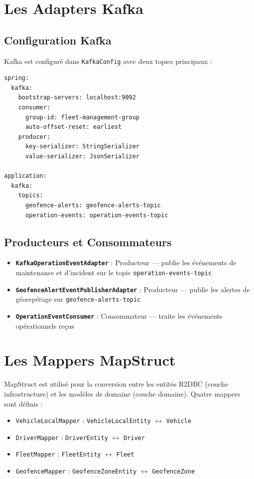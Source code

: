 \documentclass[12pt,a4paper]{report}
\begin{document}
\section{Les Adapters Kafka}

\subsection{Configuration Kafka}

Kafka est configuré dans \texttt{KafkaConfig} avec deux topics principaux :

\begin{lstlisting}[style=yamlStyle, caption={Configuration Kafka dans application.yml}]
spring:
  kafka:
    bootstrap-servers: localhost:9092
    consumer:
      group-id: fleet-management-group
      auto-offset-reset: earliest
    producer:
      key-serializer: StringSerializer
      value-serializer: JsonSerializer

application:
  kafka:
    topics:
      geofence-alerts: geofence-alerts-topic
      operation-events: operation-events-topic
\end{lstlisting}

\subsection{Producteurs et Consommateurs}

\begin{itemize}[leftmargin=2cm]
  \item \textbf{\texttt{KafkaOperationEventAdapter}} : Producteur — publie les événements de maintenance et d'incident sur le topic \texttt{operation-events-topic}
  \item \textbf{\texttt{GeofenceAlertEventPublisherAdapter}} : Producteur — publie les alertes de géorepérage sur \texttt{geofence-alerts-topic}
  \item \textbf{\texttt{OperationEventConsumer}} : Consommateur — traite les événements opérationnels reçus
\end{itemize}

\section{Les Mappers MapStruct}

MapStruct est utilisé pour la conversion entre les entités R2DBC (couche infrastructure) et les modèles de domaine (couche domaine). Quatre mappers sont définis :

\begin{itemize}[leftmargin=2cm]
  \item \texttt{VehicleLocalMapper} : \texttt{VehicleLocalEntity} $\leftrightarrow$ \texttt{Vehicle}
  \item \texttt{DriverMapper} : \texttt{DriverEntity} $\leftrightarrow$ \texttt{Driver}
  \item \texttt{FleetMapper} : \texttt{FleetEntity} $\leftrightarrow$ \texttt{Fleet}
  \item \texttt{GeofenceMapper} : \texttt{GeofenceZoneEntity} $\leftrightarrow$ \texttt{GeofenceZone}
\end{itemize}
\end{document}
